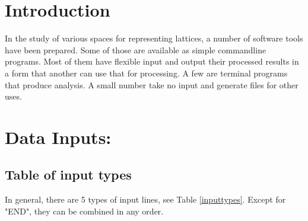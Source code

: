 \documentclass[preprint]{iucr}              %
\numberwithin{equation}{section}
\begin{document}
	\newcommand{\ci}[0]{$c_1$}
	\newcommand{\cii}[0]{$c_2$}
	\newcommand{\ciii}[0]{$c_3$}
	\begin{abstract}
	\end{abstract}
	
	
	\section{Introduction}
	
	
	In the study of various spaces for representing lattices, a
	number of software tools have been prepared. Some of those
	are available as simple commandline programs. Most of them
	have flexible input and output their processed results in 
	a form that another can use that for processing. A few
	are terminal programs that produce analysis. A small
	number take no input and generate files for other uses.
	
	
	
	
	\section{Data Inputs:}
	\subsection{Table of input types}
	
	In general, there are 5 types of input lines, see Table \ref{inputtypes}.
	Except for "END", they can be combined in any order.
	
\end{document}
